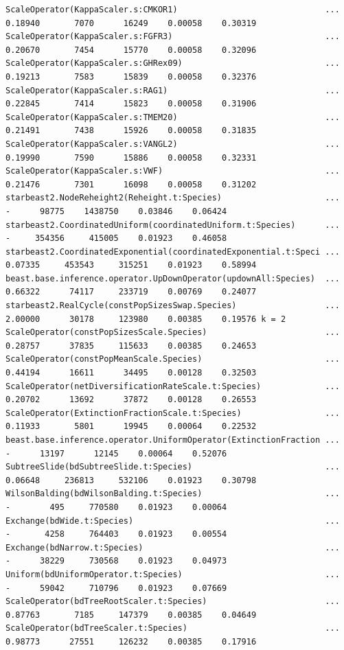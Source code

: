 \documentclass[12pt]{article}
\begin{document}
\begin{verbatim}
ScaleOperator(KappaScaler.s:CMKOR1)                              ... 0.18940       7070      16249    0.00058    0.30319 
ScaleOperator(KappaScaler.s:FGFR3)                               ... 0.20670       7454      15770    0.00058    0.32096 
ScaleOperator(KappaScaler.s:GHRex09)                             ... 0.19213       7583      15839    0.00058    0.32376 
ScaleOperator(KappaScaler.s:RAG1)                                ... 0.22845       7414      15823    0.00058    0.31906 
ScaleOperator(KappaScaler.s:TMEM20)                              ... 0.21491       7438      15926    0.00058    0.31835 
ScaleOperator(KappaScaler.s:VANGL2)                              ... 0.19990       7590      15886    0.00058    0.32331 
ScaleOperator(KappaScaler.s:VWF)                                 ... 0.21476       7301      16098    0.00058    0.31202 
starbeast2.NodeReheight2(Reheight.t:Species)                     ...       -      98775    1438750    0.03846    0.06424 
starbeast2.CoordinatedUniform(coordinatedUniform.t:Species)      ...       -     354356     415005    0.01923    0.46058 
starbeast2.CoordinatedExponential(coordinatedExponential.t:Speci ... 0.07335     453543     315251    0.01923    0.58994 
beast.base.inference.operator.UpDownOperator(updownAll:Species)  ... 0.66322      74117     233719    0.00769    0.24077 
starbeast2.RealCycle(constPopSizesSwap.Species)                  ... 2.00000      30178     123980    0.00385    0.19576 k = 2
ScaleOperator(constPopSizesScale.Species)                        ... 0.28757      37835     115633    0.00385    0.24653 
ScaleOperator(constPopMeanScale.Species)                         ... 0.44194      16611      34495    0.00128    0.32503 
ScaleOperator(netDiversificationRateScale.t:Species)             ... 0.20702      13692      37872    0.00128    0.26553 
ScaleOperator(ExtinctionFractionScale.t:Species)                 ... 0.11933       5801      19945    0.00064    0.22532 
beast.base.inference.operator.UniformOperator(ExtinctionFraction ...       -      13197      12145    0.00064    0.52076 
SubtreeSlide(bdSubtreeSlide.t:Species)                           ... 0.06648     236813     532106    0.01923    0.30798 
WilsonBalding(bdWilsonBalding.t:Species)                         ...       -        495     770580    0.01923    0.00064 
Exchange(bdWide.t:Species)                                       ...       -       4258     764403    0.01923    0.00554 
Exchange(bdNarrow.t:Species)                                     ...       -      38229     730568    0.01923    0.04973 
Uniform(bdUniformOperator.t:Species)                             ...       -      59042     710796    0.01923    0.07669 
ScaleOperator(bdTreeRootScaler.t:Species)                        ... 0.87763       7185     147379    0.00385    0.04649
ScaleOperator(bdTreeScaler.t:Species)                            ... 0.98773      27551     126232    0.00385    0.17916 


\end{verbatim}
\end{document}
